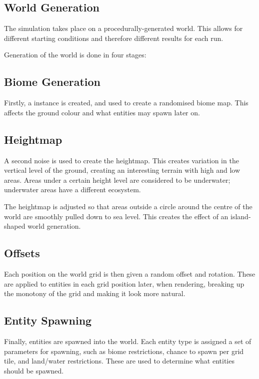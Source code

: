 \documentclass{article}
\begin{document}
\begin{multicols}{2}
        \section{World Generation}
        The simulation takes place on a procedurally-generated world. This allows for different starting conditions and therefore different results for each run.
        
        Generation of the world is done in four stages:
        
        \subsection{Biome Generation}
        
        Firstly, a \cite{FastNoiseLite} instance is created, and used to create a randomised biome map. This affects the ground colour and what entities may spawn later on.
        
        \subsection{Heightmap}
        
        A second noise is used to create the heightmap. This creates variation in the vertical level of the ground, creating an interesting terrain with high and low areas. Areas under a certain height level are considered to be underwater; underwater areas have a different ecosystem.
        
        The heightmap is adjusted so that areas outside a circle around the centre of the world are smoothly pulled down to sea level. This creates the effect of an island-shaped world generation.
        
        \subsection{Offsets}
        
        Each position on the world grid is then given a random offset and rotation. These are applied to entities in each grid position later, when rendering, breaking up the monotony of the grid and making it look more natural.
        
        \subsection{Entity Spawning}
        
        Finally, entities are spawned into the world. Each entity type is assigned a set of parameters for spawning, such as biome restrictions, chance to spawn per grid tile, and land/water restrictions. These are used to determine what entities should be spawned.
        

    \end{multicols}
\end{document}
